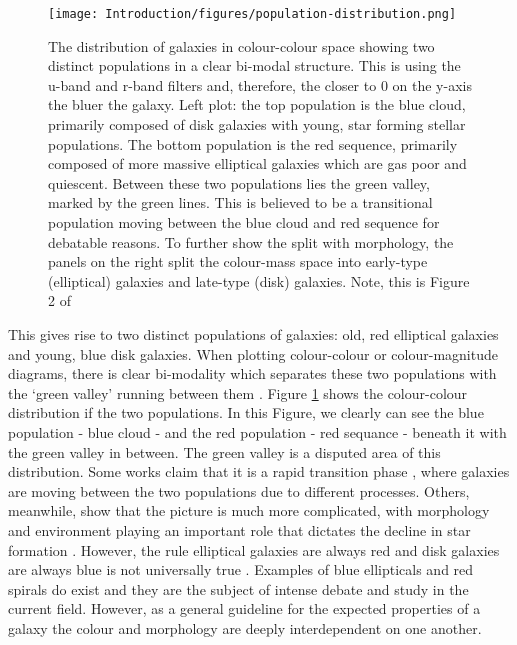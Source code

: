 \begin{figure}
\centering
\texttt{[image: Introduction/figures/population-distribution.png]}
\caption[The distribution of galaxies in colour-colour space showing two distinct populations in a clear bi-modal structure.]{The distribution of galaxies in colour-colour space showing two distinct populations in a clear bi-modal structure. This is using the u-band and r-band filters and, therefore, the closer to 0 on the y-axis the bluer the galaxy. Left plot: the top population is the blue cloud, primarily composed of disk galaxies with young, star forming stellar populations. The bottom population is the red sequence, primarily composed of more massive elliptical galaxies which are gas poor and quiescent. Between these two populations lies the green valley, marked by the green lines. This is believed to be a transitional population moving between the blue cloud and red sequence for debatable reasons. To further show the split with morphology, the panels on the right split the colour-mass space into early-type (elliptical) galaxies and late-type (disk) galaxies. Note, this is Figure 2 of \citet{2014MNRAS.440..889S}}
\label{fig:blue-red-population}
\end{figure}

This gives rise to two distinct populations of galaxies: old, red elliptical galaxies and young, blue disk galaxies. When plotting colour-colour or colour-magnitude diagrams, there is clear bi-modality which separates these two populations with the `green valley' running between them \citep{2001AJ....122.1861S}. Figure \ref{fig:blue-red-population} shows the colour-colour distribution if the two populations. In this Figure, we clearly can see the blue population - blue cloud - and the red population - red sequance - beneath it with the green valley in between. The green valley is a disputed area of this distribution. Some works claim that it is a rapid transition phase \citep{2007ApJS..173..315S, 2015MNRAS.450..435S}, where galaxies are moving between the two populations due to different processes. Others, meanwhile, show that the picture is much more complicated, with morphology and environment playing an important role that dictates the decline in star formation \citep{2014MNRAS.440..889S}. However, the rule elliptical galaxies are always red and disk galaxies are always blue is not universally true \citep{2022MNRAS.510.4126S}. Examples of blue ellipticals and red spirals do exist \citep{2009MNRAS.396..818S, 2010MNRAS.405..783M, 2022AJ....163..150K} and they are the subject of intense debate and study in the current field. However, as a general guideline for the expected properties of a galaxy the colour and morphology are deeply interdependent on one another.

